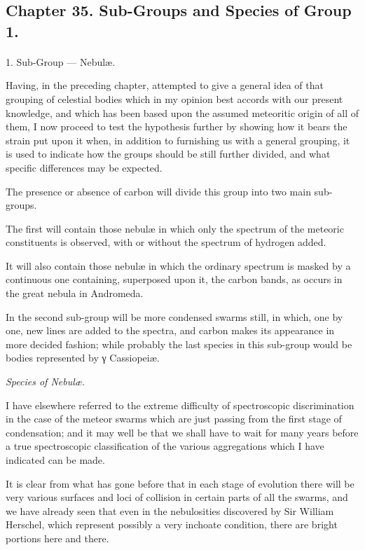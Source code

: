 \documentclass[a4paper, 12pt, oneside, polutonikogreek, english]{article}
\begin{document}
\subsection{Chapter 35. Sub-Groups and Species of Group 1.}
\paragraph{}
1. Sub-Group --- Nebulæ.

Having, in the preceding chapter, attempted to give a general idea of that grouping of celestial bodies which in my opinion best accords with our present knowledge, and which has been based upon the assumed meteoritic origin of all of them, I now proceed to test the hypothesis further by showing how it bears the strain put upon it when, in addition to furnishing us with a general grouping, it is used to indicate how the groups should be still further divided, and what specific differences may be expected.

The presence or absence of carbon will divide this group into two main sub-groups.

The first will contain those nebulæ in which only the spectrum of the meteoric constituents is observed, with or without the spectrum of hydrogen added.

It will also contain those nebulæ in which the ordinary spectrum is masked by a continuous one containing, superposed upon it, the carbon bands, as occurs in the great nebula in Andromeda.

In the second sub-group will be more condensed swarms still, in which, one by one, new lines are added to the spectra, and carbon makes its appearance in more decided fashion; while probably the last species in this sub-group would be bodies represented by γ Cassiopeiæ.

\emph{Species of Nebulæ.}

I have elsewhere referred to the extreme difficulty of spectroscopic discrimination in the case of the meteor swarms which are just passing from the first stage of condensation; and it may well be that we shall have to wait for many years before a true spectroscopic classification of the various aggregations which I have indicated can be made.

It is clear from what has gone before that in each stage of evolution there will be very various surfaces and loci of collision in certain parts of all the swarms, and we have already seen that even in the nebulosities discovered by Sir William Herschel, which represent possibly a very inchoate condition, there are bright portions here and there.
\end{document}
